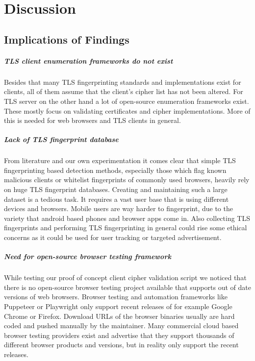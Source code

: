 \documentclass[12pt]{scrbook}
\begin{document}
\chapter{Discussion}
\section{Implications of Findings}

\paragraph{TLS client enumeration frameworks do not exist}
Besides that many TLS fingerprinting standards and implementations exist for clients,
all of them assume that the client's cipher list has not been altered. For TLS server on the other hand
a lot of open-source enumeration frameworks exist. These mostly focus on validating certificates and cipher implementations.
More of this is needed for web browsers and TLS clients in general.

\paragraph{Lack of TLS fingerprint database}
From literature and our own experimentation it comes clear that simple TLS fingerprinting
based detection methods, especially those which flag known malicious clients or whitelist
fingerprints of commonly used browsers, heavily rely on huge TLS fingerprint databases.
Creating and maintaining such a large dataset is a tedious task. It requires a vast user base
that is using different devices and browsers. Mobile users are way harder to fingerprint, due to the
variety that android based phones and browser apps come in. Also collecting TLS fingerprints and
performing TLS fingerprinting in general could rise some ethical concerns as it could be used
for user tracking or targeted advertisement.

\paragraph{Need for open-source browser testing framework}
While testing our proof of concept client cipher validation script we noticed that there is no
open-source browser testing project available that supports out of date versions of web browsers.
Browser testing and automation frameworks like Puppeteer or Playwright only support recent releases
of for example Google Chrome or Firefox. Download URLs of the browser binaries usually are hard coded
and pushed manually by the maintainer. Many commercial cloud based browser testing providers exist and
advertise that they support thousands of different browser products and versions, but in reality only support
the recent releases.
\end{document}

